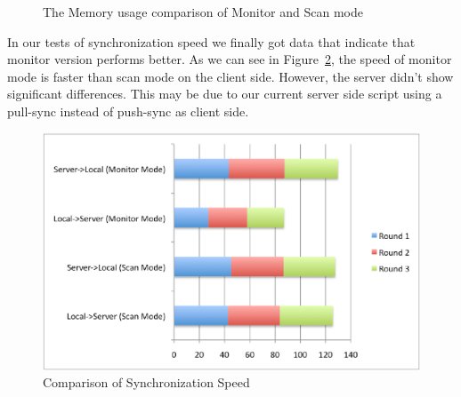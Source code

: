 \begin{figure}
\caption{The Memory usage comparison of Monitor and Scan mode}
\label{fig:memory}
\end{figure}

In our tests of synchronization speed we finally got data that indicate that monitor version performs better. 
As we can see in Figure~\ref{fig:speed}, the speed of monitor mode is faster than scan mode on the client side. However, the 
server didn't show significant differences. This may be due to our current server side script using a pull-sync instead of push-sync as client side. 
\begin{figure}[htp]
\centering
\includegraphics[scale=0.7]{speed}
\caption{Comparison of Synchronization Speed}\label{fig:speed}
\end{figure}
